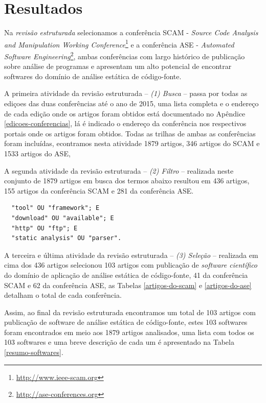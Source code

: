 \section{Resultados}

Na {\it revisão estruturada} selecionamos a conferência SCAM - {\it
Source Code Analysis and Manipulation Working
Conference}\footnote{\url{http://www.ieee-scam.org}} e a conferência ASE - {\it
Automated Software Engineering}\footnote{\url{http://ase-conferences.org}},
ambas conferências com largo histórico de publicação sobre análise de
programas e apresentam um alto potencial de encontrar softwares do domínio de
análise estática de código-fonte.

A primeira atividade da revisão estruturada -- {\it (1) Busca} -- passa por
todas as ediçoes das duas conferências até o ano de 2015, uma lista completa
e o endereço de cada edição onde os artigos foram obtidos está documentado no
Apêndice \ref{edicoes-conferencias}, lá é indicado o endereço da conferência
nos respectivos portais onde os artigos foram obtidos. Todas as trilhas de
ambas as conferências foram incluídas, econtramos nesta atividade 1879 artigos, 346 artigos
do SCAM e 1533 artigos do ASE, 


A segunda atividade da revisão estruturada -- {\it (2) Filtro} -- realizada neste
conjunto de 1879 artigos em busca dos termos abaixo resultou em 436 artigos,
155 artigos da conferência SCAM e 281 da conferência ASE.

\begin{verbatim}
  "tool" OU "framework"; E
  "download" OU "available"; E
  "http" OU "ftp"; E
  "static analysis" OU "parser".
\end{verbatim}

A terceira e última atividade da revisão estruturada -- {\it (3) Seleção} --
realizada em cima dos 436 artigos selecionou 103 artigos com publicação de {\it software
científico} do domínio de aplicação de análise estática de código-fonte, 41 da
conferência SCAM e 62 da conferência ASE, as Tabelas \ref{artigos-do-scam} e
\ref{artigos-do-ase} detalham o total de cada conferência.

Assim, ao final da revisão estruturada encontramos um total de 103 artigos com
publicação de software de análise estática de código-fonte, estes 103 softwares
foram encontrados em meio aos 1879 artigos analisados,
uma lista com todos os 103 softwares e uma breve descrição de cada um é
apresentado na Tabela \ref{resumo-softwares}.

